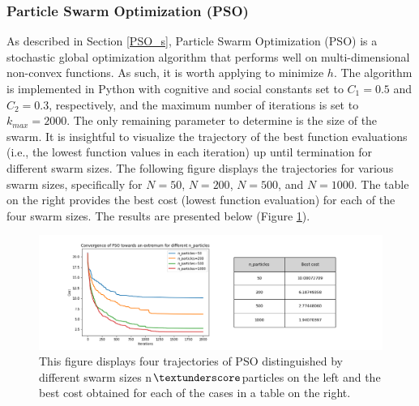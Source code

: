 \subsubsection{Particle Swarm Optimization (PSO)}
As described in Section \ref{PSO_s}, Particle Swarm Optimization (PSO) is a stochastic global optimization algorithm that performs well on multi-dimensional non-convex functions. As such, it is worth applying to minimize $h$. The algorithm is implemented in Python with cognitive and social constants set to $C_{1}=0.5$ and $C_{2}=0.3$, respectively, and the maximum number of iterations is set to $k_{max}=2000$. The only remaining parameter to determine is the size of the swarm. It is insightful to visualize the trajectory of the best function evaluations (i.e., the lowest function values in each iteration) up until termination for different swarm sizes. The following figure displays the trajectories for various swarm sizes, specifically for $N=50$, $N=200$, $N=500$, and $N=1000$. The table on the right provides the best cost (lowest function evaluation) for each of the four swarm sizes. The results are presented below (Figure \ref{fig:PSOConvMultipleSwarmSizes}).
\begin{figure}[h!]
    \centering
        \includegraphics[width=1.12\textwidth]{Pictures/PSO_convergence-ackley_multiple_n_particles_with_table.png}
    \caption{This figure displays four trajectories of PSO distinguished by different swarm sizes n$\textunderscore$particles on the left and the best cost obtained for each of the cases in a table on the right.}\label{fig:PSOConvMultipleSwarmSizes}
\end{figure}\\
